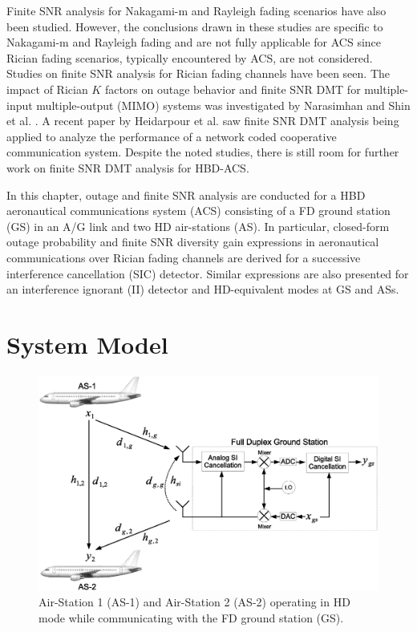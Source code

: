 Finite SNR analysis for Nakagami-m \cite{wang2012finite} and Rayleigh fading \cite{lin2013outage,yang2015efficient} scenarios have also been studied. However, the conclusions drawn in these studies are specific to Nakagami-m and Rayleigh fading and are not fully applicable for ACS since Rician fading scenarios, typically encountered by ACS, are not considered. Studies on finite SNR analysis for Rician fading channels have been seen. The impact of Rician $K$ factors on outage behavior and finite SNR DMT for multiple-input multiple-output (MIMO) systems was investigated by Narasimhan \cite{narasimhan2006finite} and Shin et al. \cite{shin2008diversity}. A recent paper by Heidarpour et al. \cite{heidarpour2017finite} saw finite SNR DMT analysis being applied to analyze the performance of a network coded cooperative communication system. Despite the noted studies, there is still room for further work on finite SNR DMT analysis for HBD-ACS. 

In this chapter, outage and finite SNR analysis are conducted for a HBD aeronautical communications system (ACS) consisting of a FD ground station (GS) in an A/G link and two HD air-stations (AS). In particular, closed-form outage probability and finite SNR diversity gain expressions in aeronautical communications over Rician fading channels are derived for a successive interference cancellation (SIC) detector. Similar expressions are also presented for an interference ignorant (II) detector and HD-equivalent modes at GS and ASs.

\section{System Model} \label{section:system_model}
\begin{figure} []
\centering
\vspace{-0.5cm}
\includegraphics [width=0.6\columnwidth]{chap4_fig/block_diagram.eps} 
\vspace{-1.0cm}
\caption{Air-Station 1 (AS-1) and Air-Station 2 (AS-2) operating in HD mode while communicating with the FD ground station (GS).}
\label{fig:1}
\end{figure}

